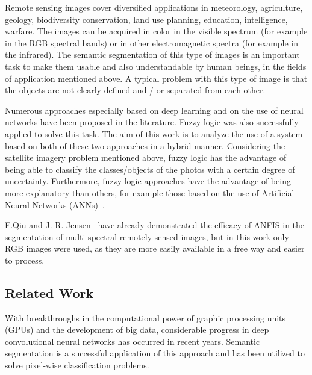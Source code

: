 \documentclass[10pt,twocolumn,letterpaper]{article}
\begin{document}
Remote sensing images cover diversified applications in meteorology, agriculture, geology, biodiversity conservation, land use planning, education, intelligence, warfare. The images can be acquired in color in the visible spectrum (for example in the RGB spectral bands) or in other electromagnetic spectra (for example in the infrared). The semantic segmentation of this type of images is an important task to make them usable and also understandable by human beings, in the fields of application mentioned above. A typical problem with this type of image is that the objects are not clearly defined and / or separated from each other.

Numerous approaches especially based on deep learning and on the use of neural networks have been proposed in the literature. Fuzzy logic was also successfully applied to solve this task.
The aim of this work is to analyze the use of a system based on both of these two approaches in a hybrid manner. Considering the satellite imagery problem mentioned above, fuzzy logic has the advantage of being able to classify the classes/objects of the photos with a certain degree of uncertainty. Furthermore, fuzzy logic approaches have the advantage of being more explanatory than others, for example those based on the use of Artificial Neural Networks (ANNs)~\cite{QiuJenenr}.

F.Qiu and J. R. Jensen~\cite{QiuJenenr} have already demonstrated the efficacy of ANFIS in the segmentation of multi spectral remotely sensed images, but in this work only RGB images were used, as they are more easily available in a free way and easier to process.

\subsection{Related Work}

With breakthroughs in the computational power of graphic processing units (GPUs) and the development of big data, considerable progress in deep convolutional neural networks has occurred in recent years. Semantic segmentation is a successful application of this approach and has been utilized to solve pixel-wise classification problems.
\end{document}
